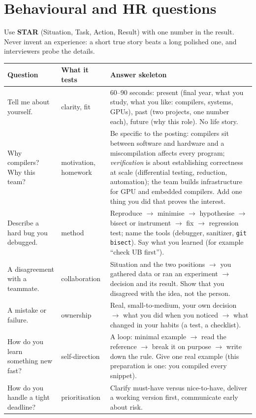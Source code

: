 \documentclass[10pt,a4paper,openany,oneside]{report}
\newcommand{\prio}[1]{\texorpdfstring{\ifcase#1\or{\color{gold}\ding{72}}\or{\color{gold}\ding{72}\ding{72}}\or{\color{gold}\ding{72}\ding{72}\ding{72}}\fi}{}}
\begin{document}
\section{Behavioural and HR questions \prio{2}}
Use \textbf{STAR} (Situation, Task, Action, Result) with one number in the result. Never invent an experience: a short true story beats a long polished one, and interviewers probe the details.
\begin{center}\small
\begin{xltabular}{\textwidth}{@{}L{3.7cm}L{3.0cm}Y@{}}
\toprule
\textbf{Question} & \textbf{What it tests} & \textbf{Answer skeleton}\\
\midrule\endhead
Tell me about yourself. & clarity, fit & 60--90 seconds: present (final year, what you study, what you like: compilers, systems, GPUs), past (two projects, one number each), future (why this role). No life story.\\
Why compilers? Why this team? & motivation, homework & Be specific to the posting: compilers sit between software and hardware and a miscompilation affects every program; \emph{verification} is about establishing correctness at scale (differential testing, reduction, automation); the team builds infrastructure for GPU and embedded compilers. Add one thing you did that proves the interest.\\
Describe a hard bug you debugged. & method & Reproduce $\to$ minimise $\to$ hypothesise $\to$ bisect or instrument $\to$ fix $\to$ regression test; name the tools (debugger, sanitizer, \texttt{git bisect}). Say what you learned (for example ``check UB first'').\\
A disagreement with a teammate. & collaboration & Situation and the two positions $\to$ you gathered data or ran an experiment $\to$ decision and its result. Show that you disagreed with the idea, not the person.\\
A mistake or failure. & ownership & Real, small-to-medium, your own decision $\to$ what you did when you noticed $\to$ what changed in your habits (a test, a checklist).\\
How do you learn something new fast? & self-direction & A loop: minimal example $\to$ read the reference $\to$ break it on purpose $\to$ write down the rule. Give one real example (this preparation is one: you compiled every snippet).\\
How do you handle a tight deadline? & prioritisation & Clarify must-have versus nice-to-have, deliver a working version first, communicate early about risk.\\

\end{xltabular}
\end{center}
\end{document}
